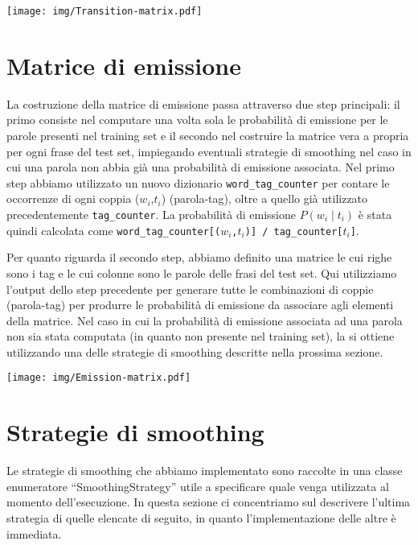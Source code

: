 \begin{center}
    \texttt{[image: img/Transition-matrix.pdf]}
\end{center}


\section{Matrice di emissione}
La costruzione della matrice di emissione passa attraverso due step principali: il primo consiste nel computare una volta sola le probabilità di emissione per le parole presenti nel training set e il secondo nel costruire la matrice vera a propria per ogni frase del test set, impiegando eventuali strategie di smoothing nel caso in cui una parola non abbia già una probabilità di emissione associata.
Nel primo step abbiamo utilizzato un nuovo dizionario \texttt{word\_tag\_counter} per contare le occorrenze di ogni coppia ($w_i$,$t_i$) (parola-tag), oltre a quello già utilizzato precedentemente \texttt{tag\_counter}.
La probabilità di emissione $P(w_i \mid t_i)$ è stata quindi calcolata come \texttt{word\_tag\_counter[($w_i$,$t_i$)] / tag\_counter[$t_i$]}.

Per quanto riguarda il secondo step, abbiamo definito una matrice le cui righe sono i tag e le cui colonne sono le parole delle frasi del test set. Qui utilizziamo l'output dello step precedente per generare tutte le combinazioni di coppie (parola-tag) per produrre le probabilità di emissione da associare agli elementi della matrice. Nel caso in cui la probabilità di emissione associata ad una parola non sia stata computata (in quanto non presente nel training set), la si ottiene utilizzando una delle strategie di smoothing descritte nella prossima sezione.
\begin{center}
    \texttt{[image: img/Emission-matrix.pdf]}
\end{center}

\section{Strategie di smoothing}
Le strategie di smoothing che abbiamo implementato sono raccolte in una classe enumeratore ``SmoothingStrategy'' utile a specificare quale venga utilizzata al momento dell'esecuzione.
In questa sezione ci concentriamo sul descrivere l'ultima strategia di quelle elencate di seguito, in quanto l'implementazione delle altre è immediata.

